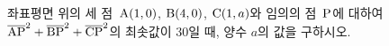 좌표평면 위의 세 점~$\mathrm{A}(1{,}\mkern3mu\mathopen{}0)$, $\mathrm{B}(4{,}\mkern3mu\mathopen{}0)$, $\mathrm{C}(1{,}\mkern3mu\mathopen{}a)$와 임의의 점~$\mathrm{P}$에 대하여 $\overline{\mathrm{AP}}^2+\overline{\mathrm{BP}}^2+\overline{\mathrm{CP}}^2$의 최솟값이 $30$일 때, 양수 $a$의 값을 구하시오.
